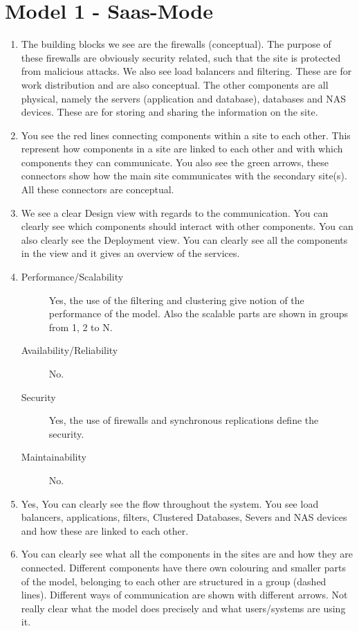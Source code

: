 \section{Model 1 - Saas-Mode}
\begin{enumerate}
	\item The building blocks we see are the firewalls (conceptual). 
	The purpose of these firewalls are obviously security related, such that the site is protected from malicious attacks. 
	We also see load balancers and filtering. 
	These are for work distribution and are also conceptual.
	The other components are all physical, namely the servers (application and database), databases and NAS devices. 
	These are for storing and sharing the information on the site.
	
	\item You see the red lines connecting components within a site to each other. 
	This represent how components in a site are linked to each other and with which components they can communicate.
	You also see the green arrows, these connectors show how the main site communicates with the secondary site(s).
	All these connectors are conceptual.
	
	\item We see a clear Design view with regards to the communication. 
	You can clearly see which components should interact with other components. 
	You can also clearly see the Deployment view. 
	You can clearly see all the components in the view and it gives an overview of the services.
	
	\item 
	\begin{description}
		\item[Performance/Scalability] Yes, the use of the filtering and clustering give notion of the performance of the model.
		Also the scalable parts are shown in groups from 1, 2 to N.
		\item[Availability/Reliability] No.
		\item[Security] Yes, the use of firewalls and synchronous replications define the security.
		\item[Maintainability] No.
	\end{description}
	
	\item Yes, You can clearly see the flow throughout the system. 
	You see load balancers, applications, filters, Clustered Databases, Severs and NAS devices and how these are linked to each other.
	
	\item You can clearly see what all the components in the sites are and how they are connected.
	Different components have there own colouring and smaller parts of the model, belonging to each other are structured in a group (dashed lines).
	Different ways of communication are shown with different arrows.
	Not really clear what the model does precisely and what users/systems are using it.
\end{enumerate}